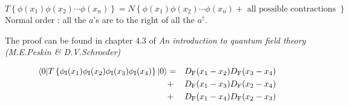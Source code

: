 \begin{newthem}
\[T \left\{ \phi(x_1) \phi(x_2) \cdots \phi(x_n)\right\} = N \left\{ \phi(x_1) \phi(x_2) \cdots \phi(x_n) + \mbox{ all possible contractions }\right\} \]
Normal order : all the $a$'s are to the right of all the $a^{\dagger}$.
\end{newthem}
\noindent
The proof can be found in chapter 4.3 of \emph{An introduction to quantum field theory (M.E.Peskin \& D.V.Schroeder)}
\begin{example}
\begin{eqnarray}
\langle 0 | T \left\{ \phi_{\rm I}(x_1) \phi_{\rm I}(x_2) \phi_{\rm I}(x_3) \phi_{\rm I}(x_4)\right\}| 0 \rangle &=& D_{\rm F}(x_1-x_2)D_{\rm F}(x_3-x_4) \nonumber \\
&+& D_{\rm F}(x_1-x_3)D_{\rm F}(x_2-x_4) \nonumber \\
&+& D_{\rm F}(x_1-x_4)D_{\rm F}(x_2-x_3) \nonumber
\end{eqnarray}
\end{example}

